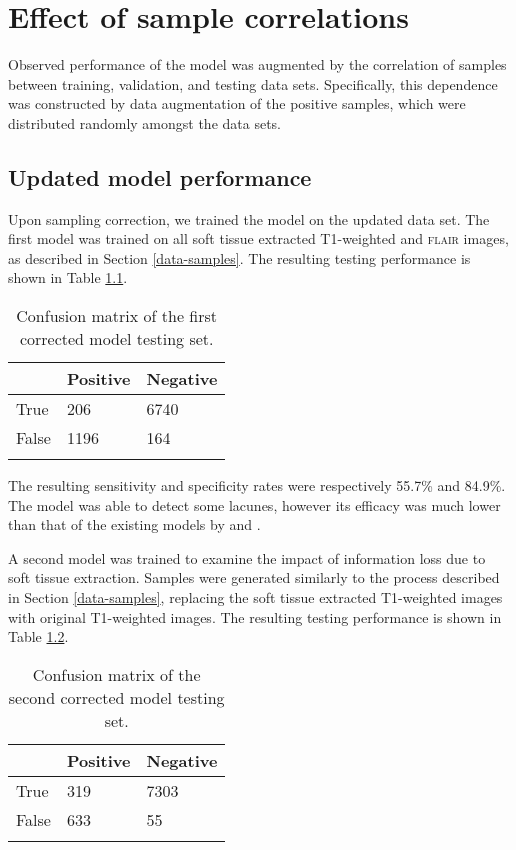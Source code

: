 %
%

\chapter{Effect of sample correlations}\label{corr}

Observed performance of the model was augmented by the correlation of samples between training, validation, and testing data sets. Specifically, this dependence was constructed by data augmentation of the positive samples, which were distributed randomly amongst the data sets.

\section{Updated model performance}

Upon sampling correction, we trained the model on the updated data set. The first model was trained on all soft tissue extracted T1-weighted and \textsc{flair} images, as described in Section \ref{data-samples}. The resulting testing performance is shown in Table \ref{corr-mod1-tab}.

\begin{table}[ht]
	\centering
	\begin{tabular}{@{}lll@{}}
	\toprule[1.5pt]
	& Positive & Negative\\
	\midrule
	True & 206 & 6740\\
	False & 1196 & 164\\
	\bottomrule[1.5pt]\\
	\end{tabular}
	\caption{\small{Confusion matrix of the first corrected model testing set.}}
	\label{corr-mod1-tab}
\end{table}

The resulting sensitivity and specificity rates were respectively 55.7\% and 84.9\%. The model was able to detect some lacunes, however its efficacy was much lower than that of the existing models by \cite{Uchiyama2015} and \cite{GhafoorianM.2017Dml3}.

A second model was trained to examine the impact of information loss due to soft tissue extraction. Samples were generated similarly to the process described in Section \ref{data-samples}, replacing the soft tissue extracted T1-weighted images with original T1-weighted images. The resulting testing performance is shown in Table \ref{corr-mod2-tab}.

\begin{table}[ht]
	\centering
	\begin{tabular}{@{}lll@{}}
	\toprule[1.5pt]
	& Positive & Negative\\
	\midrule
	True & 319 & 7303\\
	False & 633 & 55\\
	\bottomrule[1.5pt]\\
	\end{tabular}
	\caption{\small{Confusion matrix of the second corrected model testing set.}}
	\label{corr-mod2-tab}
\end{table}

